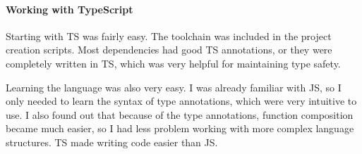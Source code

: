 \paragraph*{Working with TypeScript}\label{sec:working-with-typescript}

Starting with \acl{TS} was fairly easy.
The toolchain was included in the project creation scripts.
Most dependencies had good \acl{TS} annotations,
or they were completely written in \acl{TS},
which was very helpful for maintaining type safety.

Learning the language was also very easy.
I was already familiar with \acl{JS},
so I only needed to learn
the syntax of type annotations,
which were very intuitive to use.
I also found out that because of the type annotations,
function composition became much easier,
so I had less problem working with more complex
language structures.
\Acl{TS} made writing code easier than \acl{JS}.
